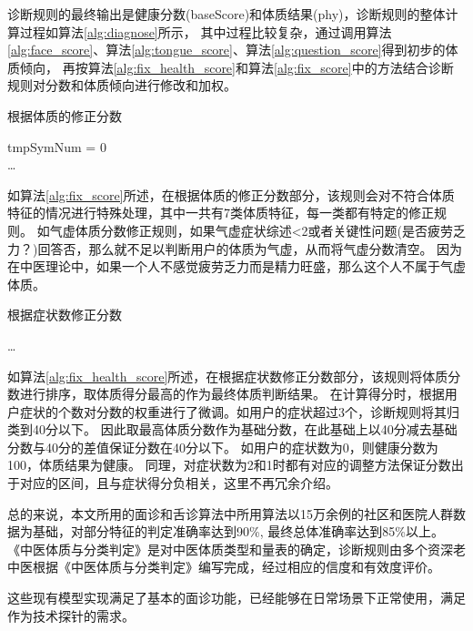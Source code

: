 诊断规则的最终输出是健康分数(baseScore)和体质结果(phy)，诊断规则的整体计算过程如算法\ref{alg:diagnose}所示，
其中过程比较复杂，通过调用算法\ref{alg:face_score}、算法\ref{alg:tongue_score}、算法\ref{alg:question_score}得到初步的体质倾向，
再按算法\ref{alg:fix_health_score}和算法\ref{alg:fix_score}中的方法结合诊断规则对分数和体质倾向进行修改和加权。

\begin{algorithm}[htbp]
\caption{根据体质的修正分数\cite{张红凯2018基于舌}}%
\label{alg:fix_score}
\LinesNumbered %
tmpSymNum = 0\\
\ldots\\
\end{algorithm}
如算法\ref{alg:fix_score}所述，在根据体质的修正分数部分，该规则会对不符合体质特征的情况进行特殊处理，其中一共有7类体质特征，每一类都有特定的修正规则。
如气虚体质分数修正规则，如果气虚症状综述<2或者关键性问题(是否疲劳乏力？)回答否，那么就不足以判断用户的体质为气虚，从而将气虚分数清空。
因为在中医理论中，如果一个人不感觉疲劳乏力而是精力旺盛，那么这个人不属于气虚体质。

\begin{algorithm}[htbp]
\caption{根据症状数修正分数\cite{张红凯2018基于舌}}%
\label{alg:fix_health_score}
\LinesNumbered %
\ldots\\
\end{algorithm}
如算法\ref{alg:fix_health_score}所述，在根据症状数修正分数部分，该规则将体质分数进行排序，取体质得分最高的作为最终体质判断结果。
在计算得分时，根据用户症状的个数对分数的权重进行了微调。如用户的症状超过3个，诊断规则将其归类到40分以下。
因此取最高体质分数作为基础分数，在此基础上以40分减去基础分数与40分的差值保证分数在40分以下。
如用户的症状数为0，则健康分数为100，体质结果为健康。
同理，对症状数为2和1时都有对应的调整方法保证分数出于对应的区间，且与症状得分负相关，这里不再冗余介绍。

总的来说，本文所用的面诊和舌诊算法中所用算法以15万余例的社区和医院人群数据为基础，对部分特征的判定准确率达到90\%, 最终总体准确率达到85\%以上\cite{Zhang2018Study, Zhao2014Qualitative}。
《中医体质与分类判定》是对中医体质类型和量表的确定，诊断规则由多个资深老中医根据《中医体质与分类判定》编写完成，经过相应的信度和有效度评价\cite{朱燕波2019不同条目版本的中医体质量表在健康人群中应用的性能比较,Zhang2018Study}。

这些现有模型实现满足了基本的面诊功能，已经能够在日常场景下正常使用，满足作为技术探针的需求。
